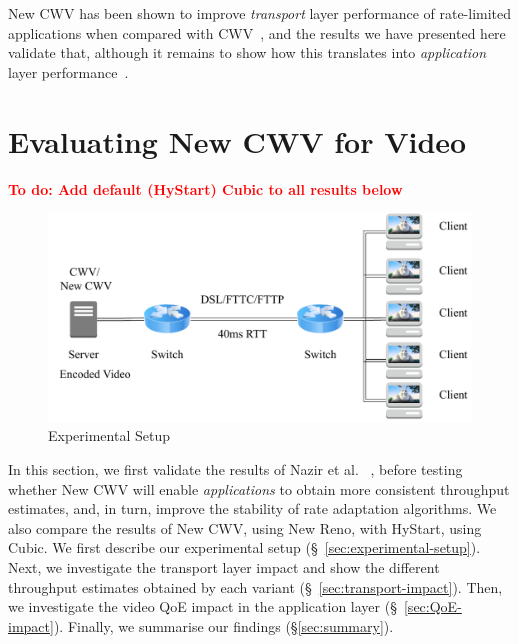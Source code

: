 \documentclass[10pt, acmlarge]{acmart}
\newcommand{\todo}[1]{\textbf{\textcolor{red}{To do: #1}}}
\begin{document}
New CWV has been shown to improve \emph{transport} layer performance of rate-limited 
applications when compared with 
CWV~\cite{Nazir-2014-performance-evaluation-congestion-window-validation-dash-newcwv}, 
and the results we have presented here validate that, although it remains to show how 
this translates into \emph{application} layer performance~\cite{Spiteri-2016-BOLA}. 

\section{Evaluating New CWV for Video}
\label{sec:evaluation}

\todo{Add default (HyStart) Cubic to all results below}

\begin{figure}
  \centering
  \includegraphics[width=\textwidth, keepaspectratio]{figures/setup.pdf}
  \caption{Experimental Setup}
  \label{fig:experimental-setup}
\end{figure}

In this section, we first validate the results of Nazir et al.
~\cite{Nazir-2014-performance-evaluation-congestion-window-validation-dash-newcwv}, 
before testing whether New CWV will enable \emph{applications} to obtain more consistent 
throughput estimates, and, in turn, improve the stability of rate adaptation algorithms.
We also compare the results of New CWV, using New Reno, with HyStart, using Cubic.
We first describe our experimental setup (\S~\ref{sec:experimental-setup}). 
Next, we investigate the transport layer impact and show the different throughput estimates
obtained by each variant (\S~\ref{sec:transport-impact}). Then, we investigate 
the video QoE impact in the application layer (\S~\ref{sec:QoE-impact}).
 Finally, we summarise our findings (\S\ref{sec:summary}).
\end{document}
